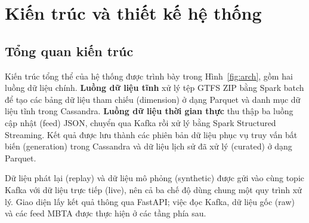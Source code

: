 \section{Kiến trúc và thiết kế hệ thống}
\label{sec:design}

\subsection{Tổng quan kiến trúc}

Kiến trúc tổng thể của hệ thống được trình bày trong Hình~\ref{fig:arch}, gồm hai luồng dữ liệu chính. \textbf{Luồng dữ liệu tĩnh} xử lý tệp GTFS ZIP bằng Spark batch để tạo các bảng dữ liệu tham chiếu (dimension) ở dạng Parquet và danh mục dữ liệu tĩnh trong Cassandra. \textbf{Luồng dữ liệu thời gian thực} thu thập ba luồng cập nhật (feed) JSON, chuyển qua Kafka rồi xử lý bằng Spark Structured Streaming. Kết quả được lưu thành các phiên bản dữ liệu phục vụ truy vấn bất biến (generation) trong Cassandra và dữ liệu lịch sử đã xử lý (curated) ở dạng Parquet.

Dữ liệu phát lại (replay) và dữ liệu mô phỏng (synthetic) được gửi vào cùng topic Kafka với dữ liệu trực tiếp (live), nên cả ba chế độ dùng chung một quy trình xử lý. Giao diện lấy kết quả thông qua FastAPI; việc đọc Kafka, dữ liệu gốc (raw) và các feed MBTA được thực hiện ở các tầng phía sau.

